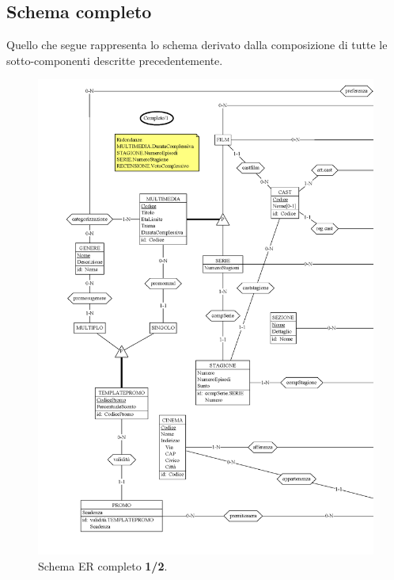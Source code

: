 \documentclass[a4paper,12pt]{report}
\begin{document}
	\subsection{Schema completo}
	Quello che segue rappresenta lo schema derivato dalla composizione di tutte le sotto-componenti descritte precedentemente.
	\begin{figure}[H]
		\centering
		\includegraphics[width=450pt]{ER/ercompletosx.png}
		\caption{Schema ER completo \textbf{1/2}.}
	\end{figure}
\end{document}
